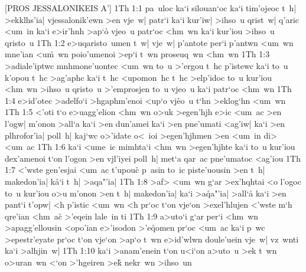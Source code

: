 [PROS JESSALONIKEIS A']
\vs 1Th 1:1
pa~uloc
ka`i
silouan`oc
ka`i
tim'ojeoc
t~h|
>ekklhs'ia|
vjessalonik'ewn
>en
vje~w|
patr`i
ka`i
kur'iw|
>ihso~u
qrist~w|
q'aric
<um~in
ka`i
e>ir'hnh
>ap`o\r{}
vjeo~u
patr`oc
<hm~wn
ka`i
kur'iou
>ihso~u
qristo~u\bibvsend
\vs 1Th 1:2
e>uqaristo~umen
t~w|
vje~w|
p'antote
per`i
p'antwn
<um~wn
mne'ian
<u\r{m}~wn
poio'umenoi
>ep`i
t~wn
proseuq~wn
<hm~wn\bibvsend
\vs 1Th 1:3
>adiale'iptwc
mnhmone'uontec
<um~wn
to~u
>'ergou
t~hc
p'istewc
ka`i
to~u
k'opou
t~hc
>ag'aphc
ka`i
t~hc
<upomon~hc
t~hc
>elp'idoc
to~u
kur'iou
<hm~wn
>ihso~u
qristo~u
>'emprosjen
to~u
vjeo~u
ka`i
patr`oc
<hm~wn\bibvsend
\vs 1Th 1:4
e>id'otec
>adelfo`i
>hgaphm'enoi
<up`o
vj\r{e}o~u
t`hn
>eklog`hn
<um~wn\bibvsend
\vs 1Th 1:5
<'oti
t`o
e>uagg'elion
<hm~wn
o>uk
>egen'hjh
e>ic
<um~ac
>en
l'ogw|
m'onon
>all`a
ka`i
>en
dun'amei
ka`i
>en
pne'umati
<ag'iw|
ka`i
>en
plhrofor'ia|
poll~h|
kaj`wc
o>'idate
o<~ioi
>egen'hjhmen
>en
<um~in
di>
<um~ac\bibvsend
\vs 1Th 1:6
ka`i
<ume~ic
mimhta`i
<hm~wn
>egen'hjhte
ka`i
to~u
kur'iou
dex'amenoi
t`on
l'ogon
>en
vjl'iyei
poll~h|
met`a
qar~ac
pne'umatoc
<ag'iou\bibvsend
\vs 1Th 1:7
<'wste
gen'esjai
<um~ac
t'upou\r{c}
p~asin
to~ic
piste'uousin
>en
t~h|
makedon'ia|
k\r{a}`i
t~h|
>aqa"'ia|\bibvsend
\vs 1Th 1:8
>af>
<um~wn
g`ar
>ex'hqhtai
<o
l'ogoc
to~u
kur'iou
o>u
m'onon
>en
t~h|
makedon'ia|
ka`i
>a\r{q}a"'ia|
>all`a\r{}
ka`i
>en
pant`i
t'opw|
<h
p'istic
<um~wn
<h
pr`oc
t`on
vje`on
>exel'hlujen
<'wste
m`h
qre'ian
<hm~ac\r{}
>'eqein
lale~in
ti\bibvsend
\vs 1Th 1:9
a>uto`i
g`ar
per`i
<hm~wn
>apagg'ellousin
<opo'ian
e>'isodon
>'e\r{q}omen
pr`oc
<um~ac
ka`i
p~wc
>epestr'eyate
pr`oc
t`on
vje`on
>ap`o
t~wn
e>id'wlwn
doule'uein
vje~w|
vz~wnti
ka`i
>alhjin~w|\bibvsend
\vs 1Th 1:10
ka`i
>anam'enein
t`on
u<i`on
a>uto~u
>ek
t~wn
o>uran~wn
<`on
>'hgeiren
>e\r{k}
nekr~wn
>ihso~un
